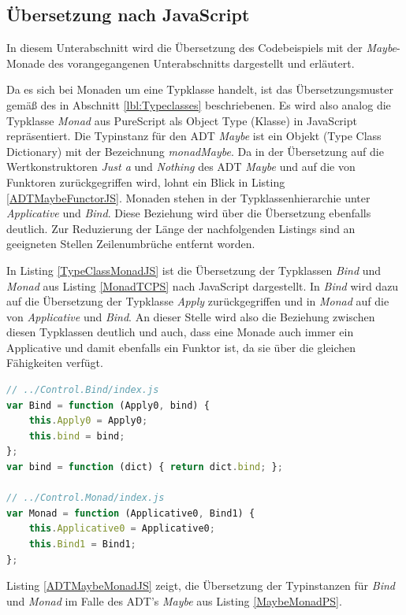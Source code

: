 \documentclass[
12pt,
ngerman,
oneside]
{scrbook} %
\begin{document}
\subsection{Übersetzung nach JavaScript}
In diesem Unterabschnitt  wird die Übersetzung des Codebeispiels mit der \emph{Maybe}-Monade des vorangegangenen Unterabschnitts dargestellt und erläutert.

Da es sich bei Monaden um eine Typklasse handelt, ist das Übersetzungsmuster gemäß des in Abschnitt \glqq \ref{lbl:Typeclasses} \grqq{} beschriebenen. Es wird also analog die Typklasse \emph{Monad} aus PureScript als Object Type (Klasse) in JavaScript repräsentiert. Die Typinstanz für den ADT \emph{Maybe} ist ein Objekt (Type Class Dictionary) mit der Bezeichnung \emph{monadMaybe}.  Da in der Übersetzung auf die Wertkonstruktoren \emph{Just a} und \emph{Nothing} des ADT \emph{Maybe} und auf die von Funktoren zurückgegriffen wird, lohnt ein Blick in Listing \ref{ADTMaybeFunctorJS}. Monaden stehen in der Typklassenhierarchie unter \emph{Applicative} und \emph{Bind}. Diese Beziehung wird über die Übersetzung ebenfalls deutlich. Zur Reduzierung der Länge der nachfolgenden Listings sind an geeigneten Stellen Zeilenumbrüche entfernt worden.

In Listing \ref{TypeClassMonadJS} ist die Übersetzung der Typklassen \emph{Bind} und \emph{Monad} aus Listing \ref{MonadTCPS} nach JavaScript dargestellt. In \emph{Bind} wird dazu auf die Übersetzung der Typklasse \emph{Apply} zurückgegriffen und in \emph{Monad} auf die von \emph{Applicative} und  \emph{Bind}. An dieser Stelle wird also die Beziehung zwischen diesen Typklassen deutlich und auch, dass eine Monade auch immer ein Applicative und damit ebenfalls ein Funktor ist, da sie über die gleichen Fähigkeiten verfügt.

\begin{lstlisting}[language=javascript, style=numbered-and-boxed, caption=Übersetzung der Typklassen \emph{Bind} und \emph{Monad}, label=TypeClassMonadJS]
// ../Control.Bind/index.js
var Bind = function (Apply0, bind) {
	this.Apply0 = Apply0;
	this.bind = bind;
};
var bind = function (dict) { return dict.bind; };

// ../Control.Monad/index.js
var Monad = function (Applicative0, Bind1) {
	this.Applicative0 = Applicative0;
	this.Bind1 = Bind1;
};
\end{lstlisting}

Listing \ref{ADTMaybeMonadJS} zeigt, die Übersetzung der Typinstanzen für \emph{Bind} und \emph{Monad} im Falle des ADT's \emph{Maybe} aus Listing \ref{MaybeMonadPS}.
\end{document}
